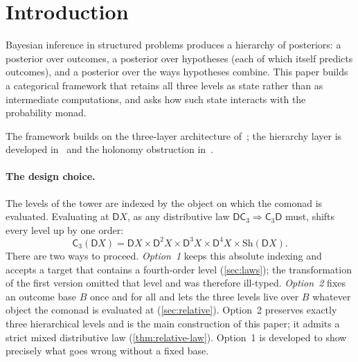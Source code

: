 \documentclass[11pt]{article}
\theoremstyle{definition}
\theoremstyle{remark}
\newcommand{\D}{\mathsf{D}}
\newcommand{\Sh}{\mathrm{Sh}}
\newcommand{\C}{\mathsf{C}}
\begin{document}
\begin{abstract}
with convex spaces over it, and we make precise that the ambient 2-category is $\mathbf{Cat}$, in which
these categories are locally discrete, so two-dimensional monad theory adds no content here; at level
one the defects of the absolute shift law are ordered in the convex order, which locates where genuine
2-cells could arise. On the
algebraic side we give a normalized partial composition on structured posteriors, corrected
conditioning laws, an exact characterization of when observational equivalence is a congruence, and
a proof that the likelihood-factorization ``iff'' holds under nondegeneracy alone. All identities and
counterexamples were checked in exact rational arithmetic; the scripts are in the accompanying
repository.
\end{abstract}

\tableofcontents

\section{Introduction}

Bayesian inference in structured problems produces a hierarchy of posteriors: a posterior over
outcomes, a posterior over hypotheses (each of which itself predicts outcomes), and a posterior over
the ways hypotheses combine. This paper builds a categorical framework that retains all three levels
as state rather than as intermediate computations, and asks how such state interacts with the
probability monad.

The framework builds on the three-layer architecture of~\cite{Awasthi-ThreeLayers}; the hierarchy
layer is developed in~\cite{Awasthi-Hierarchy} and the holonomy obstruction
in~\cite{Awasthi-Holonomy}.

\paragraph{The design choice.} The levels of the tower are indexed by the object on which the
comonad is evaluated. Evaluating at $\D X$, as any distributive law $\D\C_3\Rightarrow\C_3\D$ must,
shifts every level up by one order:
\[
\C_3(\D X)=\D X\times\D^2X\times\D^3X\times\D^4X\times\Sh(\D X).
\]
There are two ways to proceed. \emph{Option~1} keeps this absolute indexing and accepts a target that
contains a fourth-order level (\cref{sec:laws}); the transformation of the first version omitted that
level and was therefore ill-typed. \emph{Option~2} fixes an outcome base $B$ once and for all and lets
the three levels live over $B$ whatever object the comonad is evaluated at (\cref{sec:relative}).
Option~2 preserves exactly three hierarchical levels and is the main construction of this paper; it
admits a strict mixed distributive law (\cref{thm:relative-law}). Option~1 is developed to show
precisely what goes wrong without a fixed base.
\end{document}
